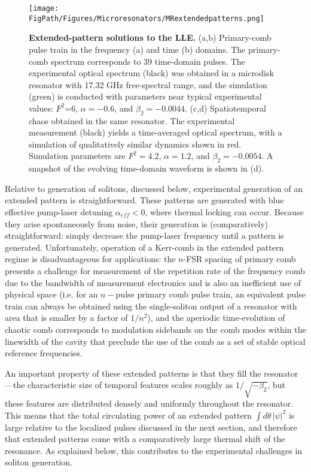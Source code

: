 \begin{figure}[htpb]
	\begin{center}
		\texttt{[image: \\FigPath/Figures/Microresonators/MRextendedpatterns.png]}
	\end{center}
	\caption[Extended-pattern solutions to the LLE]{\textbf{Extended-pattern solutions to the LLE.} (a,b) Primary-comb pulse train in the frequency (a) and time (b) domains. The primary-comb spectrum corresponds to 39 time-domain pulses. The experimental optical spectrum (black) was obtained in a microdisk resonator with 17.32 GHz free-spectral range, and the simulation (green) is conducted with parameters near typical experimental values: $F^2$=6, $\alpha=-0.6$, and $\beta_2=-0.0044$. (c,d) Spatiotemporal chaos obtained in the same resonator. The experimental measurement (black) yields a time-averaged optical spectrum, with a simulation of qualitatively similar dynamics shown in red. Simulation parameters are $F^2=4.2$, $\alpha=1.2$, and $\beta_2=-0.0054$. A snapshot of the evolving time-domain waveform is shown in (d).
	}
	
	\label{fig:MRextendedpatterns}
\end{figure} 

Relative to generation of solitons, discussed below, experimental generation of an extended pattern is straightforward. These patterns are generated with blue effective pump-laser detuning $\alpha_{eff}<0$, where thermal locking can occur. Because they arise spontaneously from noise, their generation is (comparatively) straightforward: simply decrease the pump-laser frequency until a pattern is generated. Unfortunately, operation of a Kerr-comb in the extended pattern regime is disadvantageous for applications: the $n$-FSR spacing of primary comb presents a challenge for measurement of the repetition rate of the frequency comb due to the bandwidth of measurement electronics and is also an inefficient use of physical space (i.e. for an $n-$pulse primary comb pulse train, an equivalent pulse train can always be obtained using the single-soliton output of a resonator with area that is smaller by a factor of $1/n^2$), and the aperiodic time-evolution of chaotic comb corresponds to modulation sidebands on the comb modes within the linewidth of the cavity that preclude the use of the comb as a set of stable optical reference frequencies. 

An important property of these extended patterns is that they fill the resonator---the characteristic size of temporal features scales roughly as $1/\sqrt{-\beta_2}$, but these features are distributed densely and uniformly throughout the resonator. This means that the total circulating power of an extended pattern $\int d\theta\, |\psi|^2$ is large relative to the localized pulses discussed in the next section, and therefore that extended patterns come with a comparatively large thermal shift of the resonance. As explained below, this contributes to the experimental challenges in soliton generation.



